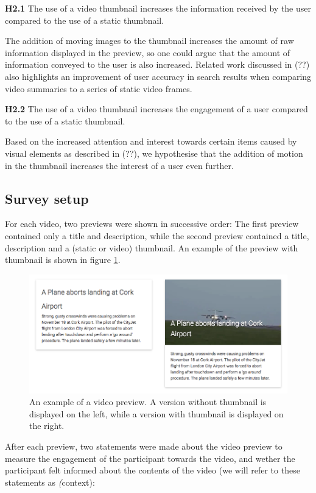 \documentclass{../resources/sig-alternate-05-2015}
\begin{document}
\textbf{H2.1} The use of a video thumbnail increases the information received by the user compared to the use of a static thumbnail.

The addition of moving images to the thumbnail increases the amount of raw information displayed in the preview, so one could argue that the amount of information conveyed to the user is also increased. Related work discussed in (??) also highlights an improvement of user accuracy in search results when comparing video summaries to a series of static video frames.

\textbf{H2.2} The use of a video thumbnail increases the engagement of a user compared to the use of a static thumbnail.

Based on the increased attention and interest towards certain items caused by visual elements as described in (??), we hypothesise that the addition of motion in the thumbnail increases the interest of a user even further.

\subsection{Survey setup}
For each video, two previews were shown in successive order: The first preview contained only a title and description, while the second preview contained a title, description and a (static or video) thumbnail. An example of the preview with thumbnail is shown in figure \ref{survey preview}.

\begin{figure}[h]
  \label{survey preview}
  \includegraphics[width=\linewidth]{resources/preview-combined.png}
  \caption{An example of a video preview. A version without thumbnail is displayed on the left, while a version with thumbnail is displayed on the right.}
\end{figure}

After each preview, two statements were made about the video preview to measure the engagement of the participant towards the video, and wether the participant felt informed about the contents of the video (we will refer to these statements as \textit(context):
\end{document}
